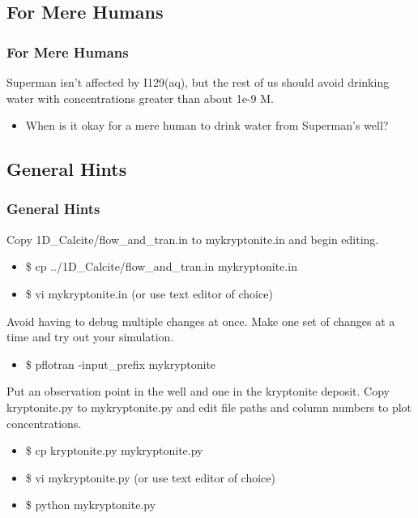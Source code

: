 \documentclass{beamer}
\newcommand\bluecomment[1]{{{\color{blue} #1}}}
\begin{document}
\subsection{For Mere Humans}

\begin{frame}[fragile]\frametitle{For Mere Humans}
Superman isn't affected by I129(aq), but the rest of us should avoid drinking water with concentrations greater than about 1e-9 M.

\begin{itemize}
  \item When is it okay for a mere human to drink water from Superman's well?
\end{itemize}

\end{frame}

\subsection{General Hints}

\begin{frame}[fragile]\frametitle{General Hints}
Copy 1D\_Calcite/flow\_and\_tran.in to mykryptonite.in and begin editing.
\begin{itemize}
  \item \$ cp ../1D\_Calcite/flow\_and\_tran.in mykryptonite.in
  \item \$ vi mykryptonite.in \bluecomment{(or use text editor of choice)}
\end{itemize}
Avoid having to debug multiple changes at once. Make one set of changes at a time and try out your simulation.
\begin{itemize}
  \item \$ pflotran -input\_prefix mykryptonite
\end{itemize}
Put an observation point in the well and one in the kryptonite deposit. Copy kryptonite.py to mykryptonite.py and edit file paths and column numbers to plot concentrations.
\begin{itemize}
  \item \$ cp kryptonite.py mykryptonite.py
  \item \$ vi mykryptonite.py \bluecomment{(or use text editor of choice)}
  \item \$ python mykryptonite.py
\end{itemize}

\end{frame}
\end{document}
